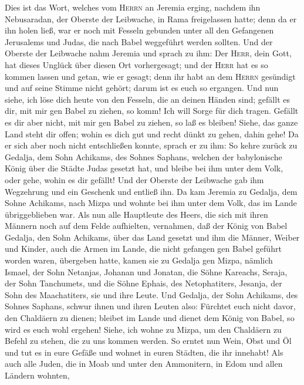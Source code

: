  Dies ist das Wort, welches vom \textsc{Herrn} an Jeremia
erging, nachdem ihn Nebusaradan, der Oberste der Leibwache, in Rama
freigelassen hatte; denn da er ihn holen ließ, war er noch mit Fesseln
gebunden unter all den Gefangenen Jerusalems und Judas, die nach Babel
weggeführt werden sollten.  Und der Oberste der Leibwache
nahm Jeremia und sprach zu ihm: Der \textsc{Herr}, dein Gott, hat dieses
Unglück über diesen Ort vorhergesagt;  und der
\textsc{Herr} hat es so kommen lassen und getan, wie er gesagt; denn ihr
habt an dem \textsc{Herrn} gesündigt und auf seine Stimme nicht gehört;
darum ist es euch so ergangen.  Und nun siehe, ich löse
dich heute von den Fesseln, die an deinen Händen sind; gefällt es dir,
mit mir gen Babel zu ziehen, so komm! Ich will Sorge für dich tragen.
Gefällt es dir aber nicht, mit mir gen Babel zu ziehen, so laß es
bleiben! Siehe, das ganze Land steht dir offen; wohin es dich gut und
recht dünkt zu gehen, dahin gehe!  Da er sich aber noch
nicht entschließen konnte, sprach er zu ihm: So kehre zurück zu Gedalja,
dem Sohn Achikams, des Sohnes Saphans, welchen der babylonische König
über die Städte Judas gesetzt hat, und bleibe bei ihm unter dem Volk,
oder gehe, wohin es dir gefällt! Und der Oberste der Leibwache gab ihm
Wegzehrung und ein Geschenk und entließ ihn.  Da kam
Jeremia zu Gedalja, dem Sohne Achikams, nach Mizpa und wohnte bei ihm
unter dem Volk, das im Lande übriggeblieben war.  Als nun
alle Hauptleute des Heers, die sich mit ihren Männern noch auf dem Felde
aufhielten, vernahmen, daß der König von Babel Gedalja, den Sohn
Achikams, über das Land gesetzt und ihm die Männer, Weiber und Kinder,
auch die Armen im Lande, die nicht gefangen gen Babel geführt worden
waren, übergeben hatte,  kamen sie zu Gedalja gen Mizpa,
nämlich Ismael, der Sohn Netanjas, Johanan und Jonatan, die Söhne
Kareachs, Seraja, der Sohn Tanchumets, und die Söhne Ephais, des
Netophatiters, Jesanja, der Sohn des Maachatiters, sie und ihre Leute.
 Und Gedalja, der Sohn Achikams, des Sohnes Saphans,
schwur ihnen und ihren Leuten also: Fürchtet euch nicht davor, den
Chaldäern zu dienen; bleibet im Lande und dienet dem König von Babel, so
wird es euch wohl ergehen!  Siehe, ich wohne zu Mizpa, um
den Chaldäern zu Befehl zu stehen, die zu uns kommen werden. So erntet
nun Wein, Obst und Öl und tut es in eure Gefäße und wohnet in euren
Städten, die ihr innehabt!  Als auch alle Juden, die in
Moab und unter den Ammonitern, in Edom und allen Ländern wohnten,
